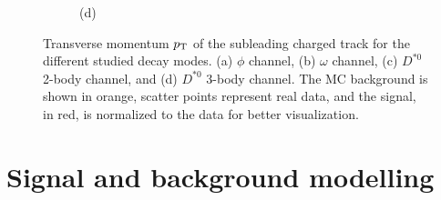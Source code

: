 \begin{figure}[!ht]
\begin{subfigure}[t]{0.50\mylength}
        \caption{\footnotesize (d)}
    \end{subfigure}%
\caption{Transverse momentum $p_\text{T}$ of the subleading charged track for the different studied decay modes. (a) $\phi$ channel, (b) $\omega$ channel, (c) $D^{*0}$ 2-body channel, and (d) $D^{*0}$ 3-body channel. The MC background is shown in orange, scatter points represent real data, and the signal, in red, is normalized to the data for better visualization.}
\label{fig:sublead_pt_data}
    \vspace*{-0.0cm}
\end{figure}

\clearpage

\section{Signal and background modelling }\label{sec:modelling}

